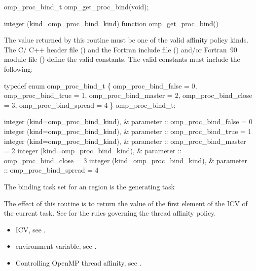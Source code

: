 \format
\ccppspecificstart
\begin{boxedcode}
omp\_proc\_bind\_t omp\_get\_proc\_bind(void);
\end{boxedcode}
\ccppspecificend

\fortranspecificstart
\begin{boxedcode}
integer (kind=omp\_proc\_bind\_kind) function omp\_get\_proc\_bind()
\end{boxedcode}
\fortranspecificend

\constraints
The value returned by this routine must be one of the valid affinity policy kinds. The C/
C++ header file () and the Fortran include file () and/or Fortran~90 
module file () define the valid constants. The valid constants must include the 
following:

\ccppspecificstart
\begin{codepar}
typedef enum omp\_proc\_bind\_t \{
  omp\_proc\_bind\_false = 0,
  omp\_proc\_bind\_true = 1,
  omp\_proc\_bind\_master = 2,
  omp\_proc\_bind\_close = 3,
  omp\_proc\_bind\_spread = 4
\} omp\_proc\_bind\_t;
\end{codepar}
\ccppspecificend

\fortranspecificstart
\begin{codepar}
integer (kind=omp\_proc\_bind\_kind), &
                parameter :: omp\_proc\_bind\_false = 0
integer (kind=omp\_proc\_bind\_kind), &
                parameter :: omp\_proc\_bind\_true = 1
integer (kind=omp\_proc\_bind\_kind), &
                parameter :: omp\_proc\_bind\_master = 2
integer (kind=omp\_proc\_bind\_kind), &
                parameter :: omp\_proc\_bind\_close = 3
integer (kind=omp\_proc\_bind\_kind), &
                parameter :: omp\_proc\_bind\_spread = 4
\end{codepar}
\fortranspecificend

\binding
The binding task set for an  region is the generating task

\effect
The effect of this routine is to return the value of the first element of the  ICV 
of the current task. See  
for the rules governing the thread affinity policy.

\crossreferences
\begin{itemize}
\item {} ICV, see 
.

\item {} environment variable, see 
.

\item Controlling OpenMP thread affinity, see 
. 
\end{itemize}










